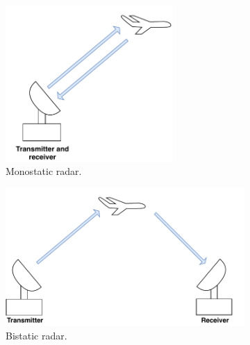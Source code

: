 \documentclass[english, 12pt, a4paper, elec, utf8, a-1b, online]{aaltothesis}
\numberwithin{equation}{section}
\begin{document}
\begin{figure}[htb]
    \centering
    \begin{subfigure}[b]{0.45\textwidth}
        \includegraphics[width=0.7\textwidth]{figures/background/radar_types_monostatic.pdf}
        \caption{Monostatic radar.}
        \label{fig:monostatic_radar}
    \end{subfigure}
    \hfill
    \begin{subfigure}[b]{0.45\textwidth}
        \includegraphics[width=\textwidth]{figures/background/radar_types_bistatic.pdf}
        \caption{Bistatic radar.}
        \label{fig:bistatic_radar}
    \end{subfigure}
    \hfill
    \begin{subfigure}[b]{0.45\textwidth}

\end{subfigure}
\end{figure}
\end{document}

